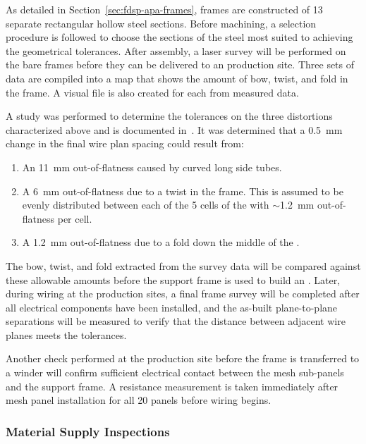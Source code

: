 As detailed in Section~\ref{sec:fdsp-apa-frames},  frames are constructed of 13 separate rectangular hollow steel sections.  Before machining, a selection procedure is followed to choose the sections of the steel most suited to achieving the geometrical tolerances.  After assembly, a laser survey will be performed on the bare frames before they can be delivered to an  production site. Three sets of data are compiled into a map that shows the amount of bow, twist, and fold in the frame. A visual file is also created for each  from measured data. 

A study was performed to determine the tolerances on the three distortions characterized above and is documented in~\cite{bib:docdb1300}.  It was determined that a \SI{0.5}{mm} change in the final wire plan spacing could result from:
\begin{enumerate}
\item An \SI{11}{mm} out-of-flatness caused by curved long side tubes.
\item A \SI{6}{mm} out-of-flatness due to a twist in the frame.  This is assumed to be evenly distributed between each of the 5 cells of the  with $\sim$\SI{1.2}{mm} out-of-flatness per cell.
\item A \SI{1.2}{mm} out-of-flatness due to a fold down the middle of the .
\end{enumerate}

The bow, twist, and fold extracted from the survey data will be compared against these allowable amounts before the support frame is used to build an .  Later, during  wiring at the production sites, a final frame survey will be completed after all electrical components have been installed, and the as-built plane-to-plane separations will be measured to verify that the distance between adjacent wire planes meets the tolerances.  

Another check performed at the  production site before the frame is transferred to a winder will confirm sufficient electrical contact between the mesh sub-panels and the  support frame.  A resistance measurement is taken immediately after mesh panel installation for all \num{20} panels before wiring begins.




\subsubsection{Material Supply Inspections}


